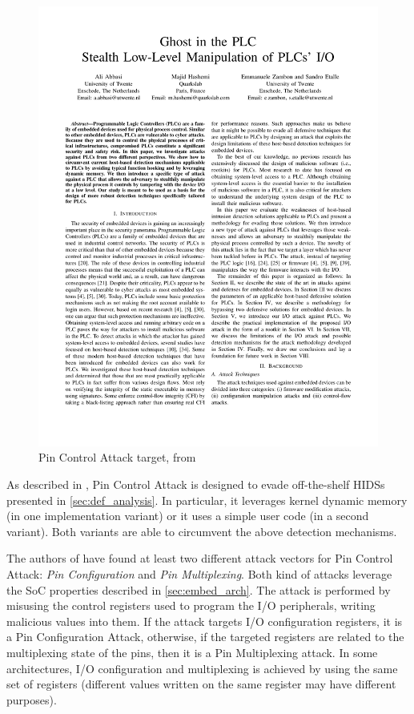 \begin{figure}[h]
\centerline{\includegraphics[page=6,viewport=50 620 300 750,clip]{res/ghostplc}}
\caption{Pin Control Attack target, from \cite{ghostplc} \label{fig:target}}
\end{figure}

As described in \cite{ghostplc}, Pin Control Attack is designed to evade off-the-shelf HIDSs presented in \sec \ref{sec:def_analysis}.
In particular, it leverages kernel dynamic memory (in one implementation variant) or it uses a simple user code (in a second variant).
Both variants are able to circumvent the above detection mechanisms.

The authors of \cite{ghostplc} have found at least two different attack vectors for Pin Control Attack: \emph{Pin Configuration} and \emph{Pin Multiplexing}.
Both kind of attacks leverage the SoC properties described in \sec \ref{sec:embed_arch}.
The attack is performed by misusing the control registers used to program the I/O peripherals, writing malicious values into them.
If the attack targets I/O configuration registers, it is a Pin Configuration Attack, otherwise, if the targeted registers are related to the multiplexing state of the pins,
then it is a Pin Multiplexing attack. In some architectures, I/O configuration and multiplexing is achieved by using the same set of registers
(\eg different values written on the same register may have different purposes).

